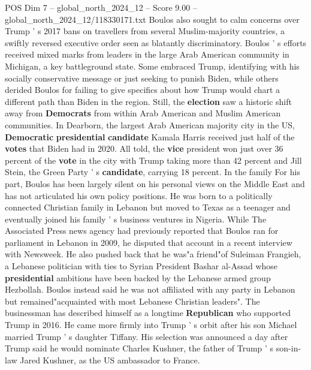 \begin{textsample}{POS Dim 7 – global\_north\_2024\_12 – Score 9.00 – global\_north\_2024\_12/118330171.txt}
Boulos also sought to calm concerns over Trump ' s 2017 bans on travellers from several Muslim-majority countries, a swiftly reversed executive order seen as blatantly discriminatory.
Boulos ' s efforts received mixed marks from leaders in the large Arab American community in Michigan, a key battleground state.
Some embraced Trump, identifying with his socially conservative message or just seeking to punish Biden, while others derided Boulos for failing to give specifics about how Trump would chart a different path than Biden in the region.
Still, the \textbf{election} saw a historic shift away from \textbf{Democrats} from within Arab American and Muslim American communities.
In Dearborn, the largest Arab American majority city in the US, \textbf{Democratic} \textbf{presidential} \textbf{candidate} Kamala Harris received just half of the \textbf{votes} that Biden had in 2020.
All told, the \textbf{vice} president won just over 36 percent of the \textbf{vote} in the city with Trump taking more than 42 percent and Jill Stein, the Green Party ' s \textbf{candidate}, carrying 18 percent.
In the family For his part, Boulos has been largely silent on his personal views on the Middle East and has not articulated his own policy positions.
He was born to a politically connected Christian family in Lebanon but moved to Texas as a teenager and eventually joined his family ' s business ventures in Nigeria.
While The Associated Press news agency had previously reported that Boulos ran for parliament in Lebanon in 2009, he disputed that account in a recent interview with Newsweek.
He also pushed back that he was"a friend"of Suleiman Frangieh, a Lebanese politician with ties to Syrian President Bashar al-Assad whose \textbf{presidential} ambitions have been backed by the Lebanese armed group Hezbollah.
Boulos instead said he was not affiliated with any party in Lebanon but remained"acquainted with most Lebanese Christian leaders".
The businessman has described himself as a longtime \textbf{Republican} who supported Trump in 2016.
He came more firmly into Trump ' s orbit after his son Michael married Trump ' s daughter Tiffany.
His selection was announced a day after Trump said he would nominate Charles Kushner, the father of Trump ' s son-in-law Jared Kushner, as the US ambassador to France.

\end{textsample}
